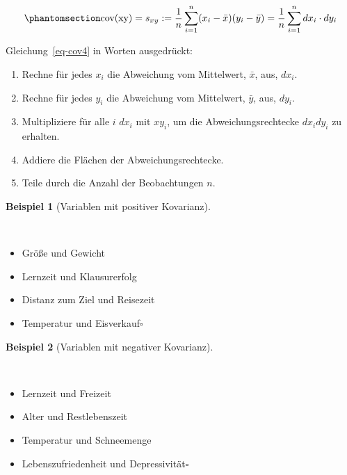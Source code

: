 \documentclass[
  letterpaper,
]{scrbook}
\providecommand{\tightlist}{%
  \setlength{\itemsep}{0pt}\setlength{\parskip}{0pt}}\usepackage{longtable,booktabs,array}
\theoremstyle{definition}
\theoremstyle{definition}
\newtheorem{example}{Beispiel}[chapter]
\theoremstyle{definition}
\theoremstyle{remark}
\begin{document}
\begin{equation}\phantomsection\label{eq-cov4}{\text{cov(xy)} = s_{xy}:=\frac{1}{n}\sum_{i=1}^n (x_i-\bar{x})(y_i-\bar{y}) = \frac{1}{n}\sum_{i=1}^n dx_i\cdot dy_i}\end{equation}

Gleichung~\ref{eq-cov4} in Worten ausgedrückt:

\begin{enumerate}
\def\labelenumi{\arabic{enumi}.}
\tightlist
\item
  Rechne für jedes \(x_i\) die Abweichung vom Mittelwert, \(\bar{x}\),
  aus, \(dx_i\).
\item
  Rechne für jedes \(y_i\) die Abweichung vom Mittelwert, \(\bar{y}\),
  aus, \(dy_i\).
\item
  Multipliziere für alle \(i\) \(dx_i\) mit \(xy_i\), um die
  Abweichungsrechtecke \(dx_i dy_i\) zu erhalten.
\item
  Addiere die Flächen der Abweichungsrechtecke.
\item
  Teile durch die Anzahl der Beobachtungen \(n\).
\end{enumerate}

\begin{example}[Variablen mit positiver
Kovarianz]\protect\hypertarget{exm-pos-kov}{}\label{exm-pos-kov}

~

\begin{itemize}
\tightlist
\item
  Größe und Gewicht
\item
  Lernzeit und Klausurerfolg
\item
  Distanz zum Ziel und Reisezeit
\item
  Temperatur und Eisverkauf\(\square\)
\end{itemize}

\end{example}

\begin{example}[Variablen mit negativer
Kovarianz]\protect\hypertarget{exm-neg-kov}{}\label{exm-neg-kov}

~

\begin{itemize}
\tightlist
\item
  Lernzeit und Freizeit
\item
  Alter und Restlebenszeit
\item
  Temperatur und Schneemenge
\item
  Lebenszufriedenheit und Depressivität\(\square\)
\end{itemize}

\end{example}
\end{document}
